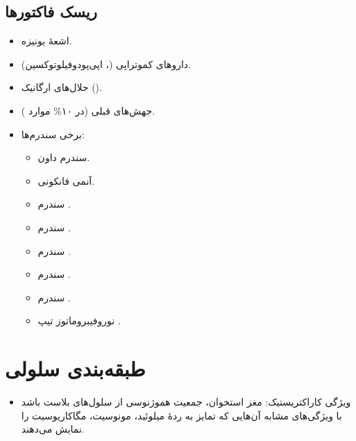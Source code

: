 \documentclass[12pt,a4paper]{article}
\begin{document}
\subsection*{ریسک فاکتورها}
\begin{itemize}
\item اشعهٔ یونیزه.
\item داروهای کموتراپی (، اپی‌پودوفیلوتوکسین).
\item حلال‌های ارگانیک ().
\item جهش‌های قبلی (در ۱۰\% موارد ).
\item برخی سندرم‌ها:
\begin{itemize}
\item سندرم داون.
\item آنمی فانکونی.
\item سندرم .
\item سندرم .
\item سندرم .
\item سندرم .
\item سندرم .
\item نوروفیبروماتوز تیپ .
\end{itemize}
\end{itemize}

\section*{طبقه‌بندی سلولی }
\begin{itemize}
\item ویژگی کاراکتریستیک:  مغز استخوان، جمعیت هموژنوسی از سلول‌های بلاست باشد با ویژگی‌های مشابه آن‌هایی که تمایز به ردهٔ میلوئید، مونوسیت، مگاکاریوسیت را نمایش می‌دهند.
\end{itemize}
\end{document}
